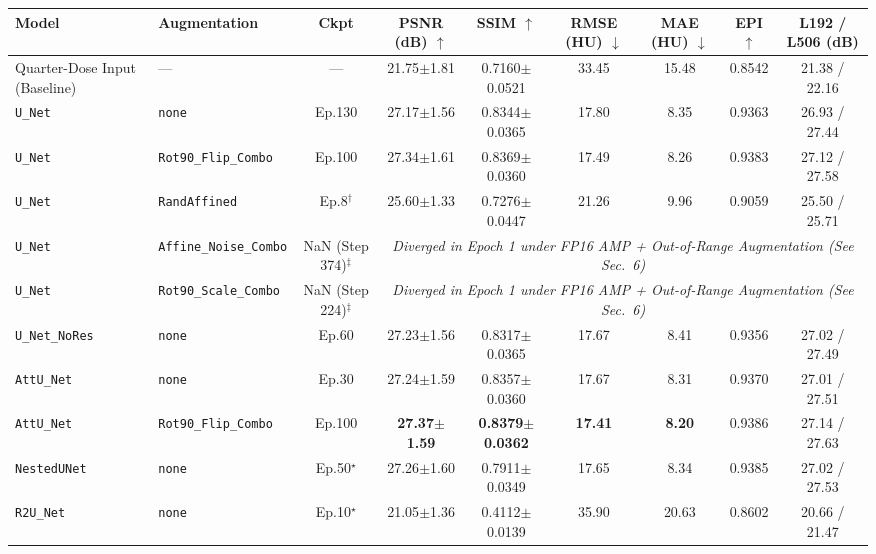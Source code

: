 \begin{tabular}{llccccccc}
\toprule
\textbf{Model} & \textbf{Augmentation} & \textbf{Ckpt} & \textbf{PSNR (dB) $\uparrow$} & \textbf{SSIM $\uparrow$} & \textbf{RMSE (HU) $\downarrow$} & \textbf{MAE (HU) $\downarrow$} & \textbf{EPI $\uparrow$} & \textbf{L192 / L506 (dB)} \\
\midrule
Quarter-Dose Input (Baseline) & --- & --- & 21.75$\pm$1.81 & 0.7160$\pm$0.0521 & 33.45 & 15.48 & 0.8542 & 21.38 / 22.16 \\
\midrule
\texttt{U\_Net} & \texttt{none} & Ep.130 & 27.17$\pm$1.56 & 0.8344$\pm$0.0365 & 17.80 & 8.35 & 0.9363 & 26.93 / 27.44 \\
\texttt{U\_Net} & \texttt{Rot90\_Flip\_Combo} & Ep.100 & 27.34$\pm$1.61 & 0.8369$\pm$0.0360 & 17.49 & 8.26 & 0.9383 & 27.12 / 27.58 \\
\texttt{U\_Net} & \texttt{RandAffined} & Ep.8$^\dagger$ & 25.60$\pm$1.33 & 0.7276$\pm$0.0447 & 21.26 & 9.96 & 0.9059 & 25.50 / 25.71 \\
\texttt{U\_Net} & \texttt{Affine\_Noise\_Combo} & NaN (Step 374)$^\ddagger$ & \multicolumn{6}{c}{\textit{Diverged in Epoch 1 under FP16 AMP + Out-of-Range Augmentation (See Sec.~6)}} \\
\texttt{U\_Net} & \texttt{Rot90\_Scale\_Combo} & NaN (Step 224)$^\ddagger$ & \multicolumn{6}{c}{\textit{Diverged in Epoch 1 under FP16 AMP + Out-of-Range Augmentation (See Sec.~6)}} \\
\texttt{U\_Net\_NoRes} & \texttt{none} & Ep.60 & 27.23$\pm$1.56 & 0.8317$\pm$0.0365 & 17.67 & 8.41 & 0.9356 & 27.02 / 27.49 \\
\texttt{AttU\_Net} & \texttt{none} & Ep.30 & 27.24$\pm$1.59 & 0.8357$\pm$0.0360 & 17.67 & 8.31 & 0.9370 & 27.01 / 27.51 \\
\texttt{AttU\_Net} & \texttt{Rot90\_Flip\_Combo} & Ep.100 & \textbf{27.37$\pm$1.59} & \textbf{0.8379$\pm$0.0362} & \textbf{17.41} & \textbf{8.20} & 0.9386 & 27.14 / 27.63 \\
\texttt{NestedUNet} & \texttt{none} & Ep.50$^\star$ & 27.26$\pm$1.60 & 0.7911$\pm$0.0349 & 17.65 & 8.34 & 0.9385 & 27.02 / 27.53 \\
\texttt{R2U\_Net} & \texttt{none} & Ep.10$^\star$ & 21.05$\pm$1.36 & 0.4112$\pm$0.0139 & 35.90 & 20.63 & 0.8602 & 20.66 / 21.47 \\
\bottomrule
\end{tabular}
